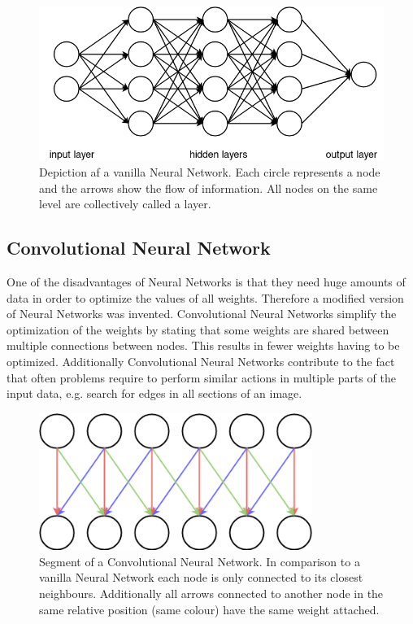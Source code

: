 \begin{figure}[h!]
	\centering
	\includegraphics[width=4.5in]{img/methodology_neuralNetwork_visualizationOfANN.png}
	\caption{Depiction af a vanilla Neural Network. Each circle represents a node and the arrows show the flow of information. All nodes on the same level are collectively called a layer.}
	\label{pic:methodology_neuralNetwork_visualizationOfANN}
\end{figure}

\subsection{Convolutional Neural Network}
One of the disadvantages of Neural Networks is that they need huge amounts of data in order to optimize the values of all weights. Therefore a modified version of Neural Networks was invented. Convolutional Neural Networks simplify the optimization of the weights by stating that some weights are shared between multiple connections between nodes. This results in fewer weights having to be optimized. Additionally Convolutional Neural Networks contribute to the fact that often problems require to perform similar actions in multiple parts of the input data, e.g. search for edges in all sections of an image.

\begin{figure}[h!]
	\centering
	\includegraphics[width=3.5in]{img/methodology_neuralNetwork_visualizationOfACNN.png}
	\caption{Segment of a Convolutional Neural Network. In comparison to a vanilla Neural Network each node is only connected to its closest neighbours. Additionally all arrows connected to another node in the same relative position (same colour) have the same weight attached.}
	\label{pic:methodology_neuralNetwork_visualizationOfACNN}
\end{figure}

